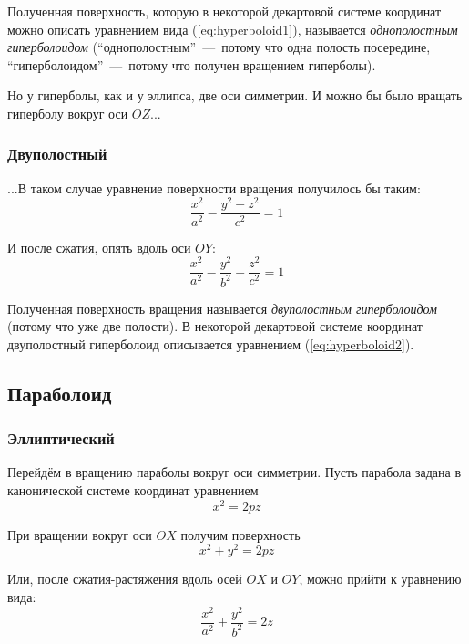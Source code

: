\documentclass[a4paper,12pt]{article}
\begin{document}
  Полученная поверхность, которую в некоторой декартовой системе координат можно описать уравнением вида (\ref{eq:hyperboloid1}), называется \emph{однополостным гиперболоидом} (``однополостным''~---~потому что одна полость посередине, ``гиперболоидом''~---~потому что получен вращением гиперболы).
  
  Но у гиперболы, как и у эллипса, две оси симметрии.
  И можно бы было вращать гиперболу вокруг оси $OZ$...
  
  
  \subsubsection{Двуполостный}
  
  
  ...В таком случае уравнение поверхности вращения получилось бы таким:
  \[
    \frac{x^2}{a^2} - \frac{y^2 + z^2}{c^2} = 1
  \]
  
  И после сжатия, опять вдоль оси $OY$:  %
  \begin{equation}
    \label{eq:hyperboloid2}
    \frac{x^2}{a^2} - \frac{y^2}{b^2} - \frac{z^2}{c^2} = 1
  \end{equation}
  
  Полученная поверхность вращения называется \emph{двуполостным гиперболоидом} (потому что уже две полости).
  В некоторой декартовой системе координат двуполостный гиперболоид описывается уравнением (\ref{eq:hyperboloid2}).
  
  
  \subsection{Параболоид}
  
  
  \subsubsection{Эллиптический}
  
  Перейдём в вращению параболы вокруг оси симметрии.
  Пусть парабола задана в канонической системе координат уравнением
  \[
    x^2 = 2pz
  \]
  
  При вращении вокруг оси $OX$ получим поверхность
  \[
    x^2 + y^2 = 2pz
  \]
  
  
  Или, после сжатия-растяжения вдоль осей $OX$ и $OY$, можно прийти к уравнению вида:
  \begin{equation}
    \label{eq:paraboloid1}
    \frac{x^2}{a^2} + \frac{y^2}{b^2} = 2z
  \end{equation}
  
\end{document}
